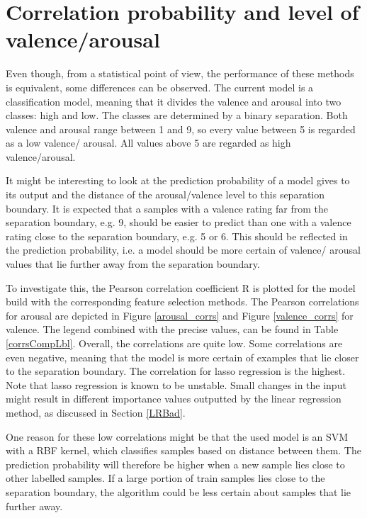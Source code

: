 \section{Correlation probability and level of valence/arousal}

Even though, from a statistical point of view, the performance of these methods is equivalent, some differences can be observed. The current model is a classification model, meaning that it divides the valence and arousal into two classes: high and low. The classes are determined by a binary separation. Both valence and arousal range between 1 and 9, so every value between 5 is regarded as a low valence/ arousal. All values above 5 are regarded as high valence/arousal.

\npar

It might be interesting to look at the prediction probability of a model gives to its output and the distance of the arousal/valence level to this separation boundary. It is expected that a samples with a valence rating far from the separation boundary, e.g. 9, should be easier to predict than one with a valence rating close to the separation boundary, e.g. 5 or 6. This should be reflected in the prediction probability, i.e. a model should be more certain of valence/ arousal values that lie further away from the separation boundary.

\npar

To investigate this, the Pearson correlation coefficient R is plotted for the model build with the corresponding feature selection methods. The Pearson correlations for arousal are depicted in Figure \ref{arousal_corrs} and Figure \ref{valence_corrs} for valence. The legend combined with the precise values, can be found in Table \ref{corrsCompLbl}. Overall, the correlations are quite low. Some correlations are even negative, meaning that the model is more certain of examples that lie closer to the separation boundary. The correlation for lasso regression is the highest. Note that lasso regression is known to be unstable. Small changes in the input might result in different importance values outputted by the linear regression method, as discussed in Section \ref{LRBad}.

\npar
One reason for these low correlations might be that the used model is an SVM with a RBF kernel, which classifies samples based on distance between them. The prediction probability will therefore be higher when a new sample lies close to other labelled samples. If a large portion of train samples lies close to the separation boundary, the algorithm could be less certain about samples that lie further away.

